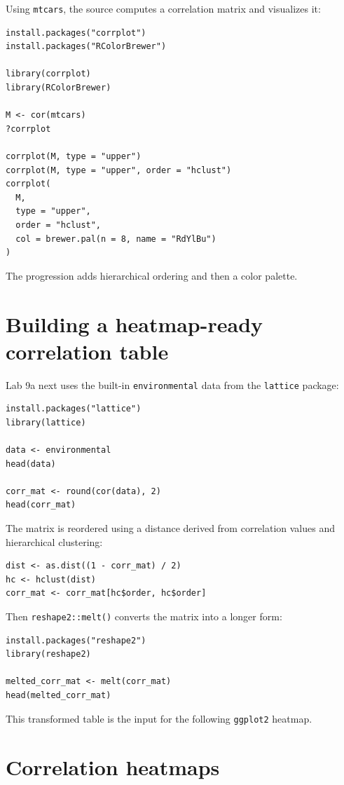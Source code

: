 Using \texttt{mtcars}, the source computes a correlation matrix and visualizes it:

\begin{lstlisting}[style=dsr]
install.packages("corrplot")
install.packages("RColorBrewer")

library(corrplot)
library(RColorBrewer)

M <- cor(mtcars)
?corrplot

corrplot(M, type = "upper")
corrplot(M, type = "upper", order = "hclust")
corrplot(
  M,
  type = "upper",
  order = "hclust",
  col = brewer.pal(n = 8, name = "RdYlBu")
)
\end{lstlisting}

The progression adds hierarchical ordering and then a color palette.

\section{Building a heatmap-ready correlation table}

Lab 9a next uses the built-in \texttt{environmental} data from the \texttt{lattice} package:

\begin{lstlisting}[style=dsr]
install.packages("lattice")
library(lattice)

data <- environmental
head(data)

corr_mat <- round(cor(data), 2)
head(corr_mat)
\end{lstlisting}

The matrix is reordered using a distance derived from correlation values and hierarchical clustering:

\begin{lstlisting}[style=dsr]
dist <- as.dist((1 - corr_mat) / 2)
hc <- hclust(dist)
corr_mat <- corr_mat[hc$order, hc$order]
\end{lstlisting}

Then \texttt{reshape2::melt()} converts the matrix into a longer form:

\begin{lstlisting}[style=dsr]
install.packages("reshape2")
library(reshape2)

melted_corr_mat <- melt(corr_mat)
head(melted_corr_mat)
\end{lstlisting}

This transformed table is the input for the following \texttt{ggplot2} heatmap.

\section{Correlation heatmaps}

